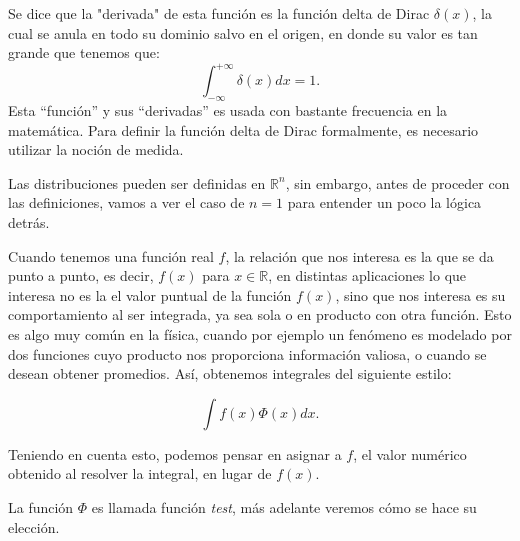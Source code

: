 \documentclass[letter,12pt]{article}
\begin{document}
Se dice que la "derivada" de esta función es la función delta de Dirac $ \delta(x) $, la cual se anula en todo su dominio salvo en el origen, en donde su valor es tan grande que tenemos que:
\begin{equation}
	\int_{-\infty}^{+\infty}\delta(x) dx = 1.
\end{equation} 
Esta ``función'' y sus ``derivadas'' es usada con bastante frecuencia en la matemática.
Para definir la función delta de Dirac formalmente, es necesario utilizar la noción de medida.

Las distribuciones pueden ser definidas en $ \mathbb{R}^n $, sin embargo, antes de proceder con las definiciones, vamos a ver el caso de $ n =1 $ para entender un poco la lógica detrás.

Cuando tenemos una función real $ f $, la relación que nos interesa es la que se da
punto a punto, es decir, $ f(x) $ para $ x \in \mathbb{R} $, 
en distintas aplicaciones lo que interesa no es la el valor puntual de la función 
$ f(x) $, sino que nos interesa es su comportamiento al ser integrada, ya sea sola 
o en producto con otra función. Esto es algo muy común en la física, cuando 
por ejemplo un fenómeno es modelado por dos funciones cuyo producto nos
proporciona información valiosa, o cuando se desean obtener promedios. 
Así, obtenemos integrales del siguiente estilo:

\begin{equation}
	\int{f(x)\Phi(x)}dx.
\end{equation}

Teniendo en cuenta esto, podemos pensar en asignar a $ f $, el valor numérico obtenido al
resolver la integral, en lugar de $ f(x) $.

La función $ \Phi $ es llamada función \textit{test}, más adelante veremos cómo se hace su elección.
\end{document}
